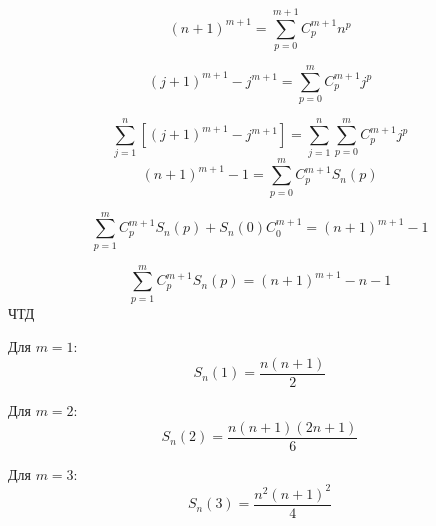 \documentclass[a4paper,12pt]{article}
\begin{document}
\[
(n+1)^{m+1} = \sum_{p=0}^{m+1} C_p^{m+1} n^p
\]

\[
(j+1)^{m+1} - j^{m+1} = \sum_{p=0}^{m} C_p^{m+1} j^p
\]

\[
\sum_{j=1}^{n} \left[(j+1)^{m+1} - j^{m+1}\right] = \sum_{j=1}^{n} \sum_{p=0}^{m} C_p^{m+1} j^p
\]
\[
(n+1)^{m+1} - 1 = \sum_{p=0}^{m} C_p^{m+1} S_n(p)
\]

\[
\sum_{p=1}^{m} C_p^{m+1} S_n(p) + S_n(0) C_0^{m+1} = (n+1)^{m+1} - 1
\]

\[
\sum_{p=1}^{m} C_p^{m+1} S_n(p) = (n+1)^{m+1} - n - 1
\]
ЧТД

Для \(m=1\):
   \[
   S_n(1) = \frac{n(n+1)}{2}
   \]

Для \(m=2\):
   \[
   S_n(2) = \frac{n(n+1)(2n+1)}{6}
   \]

Для \(m=3\):
   \[
   S_n(3) = \frac{n^2(n+1)^2}{4}
   \]
\vspace{1cm}
\end{document}
